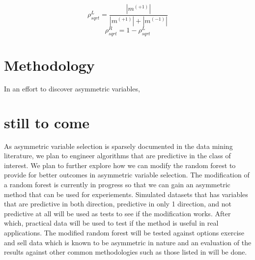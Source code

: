  \begin{equation}\label{eqn:rho_sqrt}
	\rho_{sqrt}^L = \frac{|m^(+1)|}{|m^(+1)|+|m^(-1)|}
\end{equation}
\begin{equation}
	\rho_{sqrt}^R = 1- \rho_{sqrt}^L
\end{equation}

\section{Methodology}
In an effort to discover asymmetric variables, 



\section{still to come}
As asymmetric variable selection is sparsely documented in the data mining literature, we plan to engineer algorithms that are predictive in the class of interest. We plan to further explore how we can modify the random forest to provide for better outcomes in asymmetric variable selection. The modification of a random forest is currently in progress so that we can gain an asymmetric method that can be used for experiements. Simulated datasets that has variables that are predictive in both direction, predictive in only 1 direction, and not predictive at all will be used as tests to see if the modification works. After which, practical data will be used to test if the method is useful in real applications. The modified random forest will be tested against options exercise and sell data which is known to be asymmetric in nature and an evaluation of the results against other common methodologies such as those listed in \citet{Berk2011} will be done.




	

